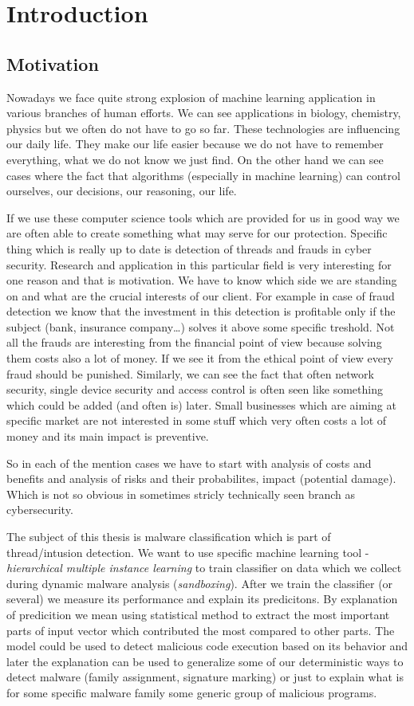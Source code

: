 \chapter{Introduction} \label{chap:intro}
\section{Motivation}
Nowadays we face quite strong explosion of machine learning application in various branches of human efforts. We can see applications in biology, chemistry, physics but we often do not have to go so far. These technologies are influencing our daily life. They make our life easier because we do not have to remember everything, what we do not know we just find. On the other hand we can see cases where the fact that algorithms (especially in machine learning) can control ourselves, our decisions, our reasoning, our life.

If we use these computer science tools which are provided for us in good way we are often able to create something what may serve for our protection. Specific thing which is really up to date is detection of threads and frauds in cyber security. Research and application in this particular field is very interesting for one reason and that is motivation. We have to know which side we are standing on and what are the crucial interests of our client. For example in case of fraud detection we know that the investment in this detection is profitable only if the subject (bank, insurance company\dots) solves it above some specific treshold. Not all the frauds are interesting from the financial point of view because solving them costs also a lot of money. If we see it from the ethical point of view every fraud should be punished. Similarly, we can see the fact that often network security, single device security and access control is often seen like something which could be added (and often is) later. Small businesses which are aiming at specific market are not interested in some stuff which very often costs a lot of money and its main impact is preventive. 

So in each of the mention cases we have to start with analysis of costs and benefits and analysis of risks and their probabilites, impact (potential damage). Which is not so obvious in sometimes stricly technically seen branch as cybersecurity.

The subject of this thesis is malware classification which is part of thread/intusion detection. We want to use specific machine learning tool - \emph{hierarchical multiple instance learning} to train classifier on data which we collect during dynamic malware analysis (\emph{sandboxing}). After we train the classifier (or several) we measure its performance and explain its predicitons. By explanation of predicition we mean using statistical method to extract the most important parts of input vector which contributed the most compared to other parts. The model could be used to detect malicious code execution based on its behavior and later the explanation can be used to generalize some of our deterministic ways to detect malware (family assignment, signature marking) or just to explain what is for some specific malware family some generic group of malicious programs.

